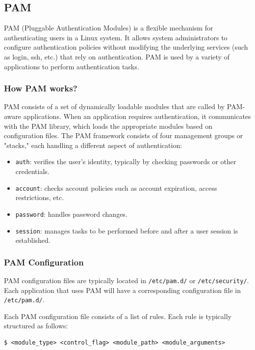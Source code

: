 \documentclass{article}
\newenvironment{codetemplate}[1][]{%
  \mybasecolorbox[#1]
  \itshape
}{%
  \endmybasecolorbox
}
\begin{document}
\subsection{PAM}
PAM (Pluggable Authentication Modules) is a flexible mechanism for authenticating users in a Linux system. It allows system administrators to configure authentication policies without modifying the underlying services (such as login, ssh, etc.) that rely on authentication. PAM is used by a variety of applications to perform authentication tasks.

\subsubsection{How PAM works?}
PAM consists of a set of dynamically loadable modules that are called by PAM-aware applications. When an application requires authentication, it communicates with the PAM library, which loads the appropriate modules based on configuration files. The PAM framework consists of four management groups or "stacks," each handling a different aspect of authentication:
\begin{itemize}
    \item \verb|auth|: verifies the user's identity, typically by checking passwords or other credentials.
    \item \verb|account|: checks account policies such as account expiration, access restrictions, etc.
    \item \verb|password|: handles password changes.
    \item \verb|session|: manages tasks to be performed before and after a user session is established.
\end{itemize}

\subsubsection{PAM Configuration}
PAM configuration files are typically located in \verb|/etc/pam.d/| or \verb|/etc/security/|. Each application that uses PAM will have a corresponding configuration file in \verb|/etc/pam.d/|. 

Each PAM configuration file consists of a list of rules. Each rule is typically structured as follows:
\begin{codetemplate}{}
\begin{verbatim}
$ <module_type> <control_flag> <module_path> <module_arguments>
\end{verbatim}
\end{codetemplate}
\end{document}
